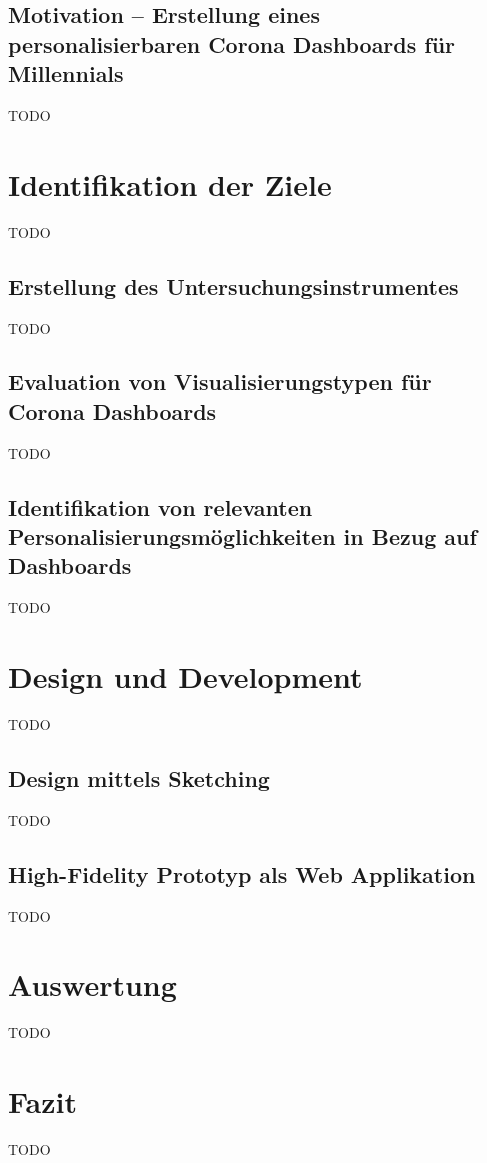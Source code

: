 \documentclass[12pt, oneside]{article}
\begin{document}
\subsection{Motivation – Erstellung eines personalisierbaren Corona Dashboards für Millennials}
TODO

\clearpage
\section{Identifikation der Ziele}
TODO

\subsection{Erstellung des Untersuchungsinstrumentes}
TODO

\subsection{Evaluation von Visualisierungstypen für Corona Dashboards}
TODO

\subsection{Identifikation von relevanten Personalisierungsmöglichkeiten in Bezug auf Dashboards}
TODO

\clearpage
\section{Design und Development}
TODO

\subsection{Design mittels Sketching}
TODO

\subsection{High-Fidelity Prototyp als Web Applikation}
TODO

\clearpage
\section{Auswertung}
TODO

\clearpage
\section{Fazit}
TODO
\end{document}
